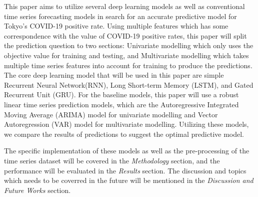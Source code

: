 This paper aims to utilize several deep learning models as well as conventional time series forecasting models in search for an accurate predictive model for Tokyo's COVID-19 positive rate. Using multiple features which has some correspondence with the value of COVID-19 positive rates, this paper will split the prediction question to two sections: Univariate modelling which only uses the objective value for training and testing, and Multivariate modelling which takes multiple time series features into account for training to produce the predictions. The core deep learning model that will be used in this paper are simple Recurrent Neural Network(RNN), Long Short-term Memory (LSTM), and Gated Recurrent Unit (GRU). For the baseline models, this paper will use a robust linear time series prediction models, which are the Autoregressive Integrated Moving Average (ARIMA) model for univariate modelling and Vector Autoregression (VAR) model for multivariate modelling. Utilizing these models, we compare the results of predictions to suggest the optimal predictive model. 

The specific implementation of these models as well as the pre-processing of the time series dataset will be covered in the \textit{Methodology} section, and the performance will be evaluated in the \textit{Results} section. The discussion and topics which needs to be coverred in the future will be mentioned in the \textit{Discussion and Future Works} section. 